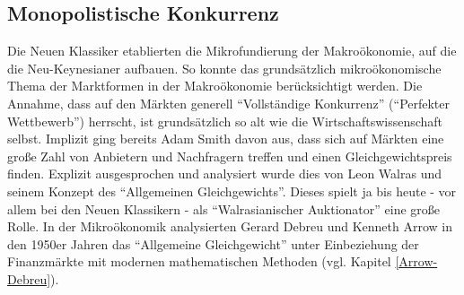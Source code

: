 \subsection{Monopolistische Konkurrenz}
\label{Monopol}
Die Neuen Klassiker etablierten die Mikrofundierung der Makroökonomie, auf die die Neu-Keynesianer aufbauen. So konnte das grundsätzlich mikroökonomische Thema der Marktformen in der Makroökonomie berücksichtigt werden. Die Annahme, dass auf den Märkten generell "`Vollständige Konkurrenz"' ("`Perfekter Wettbewerb"') herrscht, ist grundsätzlich so alt wie die Wirtschaftswissenschaft selbst. Implizit ging bereits Adam Smith davon aus, dass sich auf Märkten eine große Zahl von Anbietern und Nachfragern treffen und einen Gleichgewichtspreis finden. Explizit ausgesprochen und analysiert wurde dies von Leon Walras und seinem Konzept des "`Allgemeinen Gleichgewichts"'. Dieses spielt ja bis heute - vor allem bei den Neuen Klassikern - als "`Walrasianischer Auktionator"' eine große Rolle. In der Mikroökonomik analysierten Gerard Debreu und Kenneth Arrow in den 1950er Jahren das "`Allgemeine Gleichgewicht"' unter Einbeziehung der Finanzmärkte mit modernen mathematischen Methoden (vgl. Kapitel \ref{Arrow-Debreu}). 

